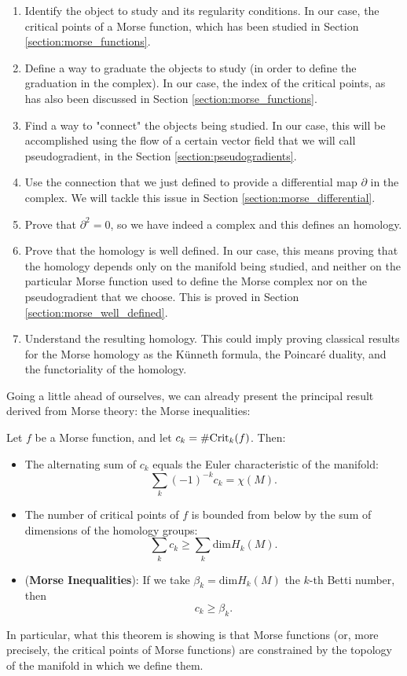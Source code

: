 \begin{enumerate}
\item Identify the object to study and its regularity conditions. In our case, the critical points of a Morse function, which has been studied in Section \ref{section:morse_functions}.
\item Define a way to graduate the objects to study (in order to define the graduation in the complex). In our case, the index of the critical points, as has also been discussed in Section \ref{section:morse_functions}.
\item Find a way to "connect" the objects being studied. In our case, this will be accomplished using the flow of a certain vector field that we will call pseudogradient, in the Section \ref{section:pseudogradients}.
\item Use the connection that we just defined to provide a differential map $\partial$ in the complex. We will tackle this issue in Section \ref{section:morse_differential}.
\item Prove that $\partial^2 = 0$, so we have indeed a complex and this defines an homology.
\item Prove that the homology is well defined. In our case, this means proving that the homology depends only on the manifold being studied, and neither on the particular Morse function used to define the Morse complex nor on the pseudogradient that we choose. This is proved in Section \ref{section:morse_well_defined}.
\item Understand the resulting homology. This could imply proving classical results for the Morse homology as the Künneth formula, the Poincaré duality, and the functoriality of the homology.
\end{enumerate}

Going a little ahead of ourselves, we can already present the principal result derived from Morse theory: the Morse inequalities:

\begin{theo} Let $f$ be a Morse function, and let $c_k = \# \mathrm{Crit}_k(f)$. Then:

\begin{itemize}
	\item The alternating sum of $c_k$ equals the Euler characteristic of the manifold:
	\[\sum_k (-1)^{-k}c_k = \chi(M) .\]
	\item The number of critical points of $f$ is bounded from below by the sum of dimensions of the homology groups:
	\[\sum_k c_k \geq \sum_k \text{dim} H_k(M) .\]
	\item ({\bf Morse Inequalities}): If we take $\beta_k = \text{dim} H_k(M)$ the $k$-th Betti number, then
	\[c_k \geq \beta_k .\]
\end{itemize}
\end{theo}

In particular, what this theorem is showing is that Morse functions (or, more precisely, the critical points of Morse functions) are constrained by the topology of the manifold in which we define them.
